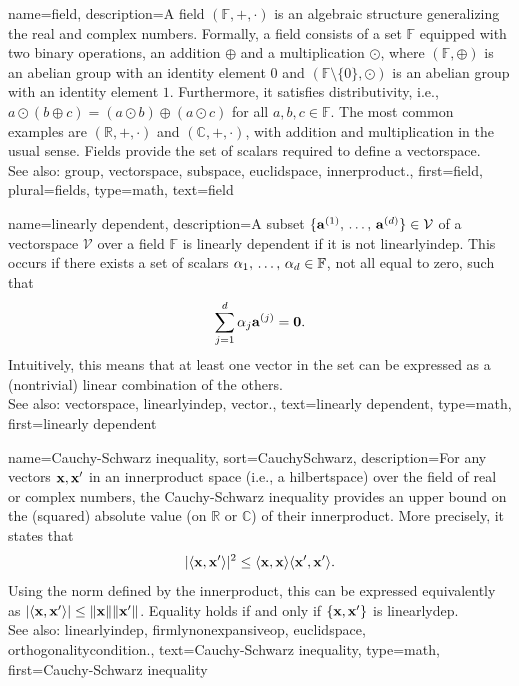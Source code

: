 {name={field},
	description={A field $(\mathbb{F}, +, \cdot)$ is an algebraic structure generalizing the real and complex numbers. 
		Formally, a field consists of a set $\mathbb{F}$ equipped with two binary operations, an addition $\oplus$ 
		and a multiplication $\odot$, where $(\mathbb{F}, \oplus)$ is an abelian \gls{group} with an identity element $0$ 
		and $(\mathbb{F} \setminus \{0\}, \odot)$ is an abelian \gls{group} with an identity element $1$. 
		Furthermore, it satisfies distributivity, i.e.,  $a \odot (b \oplus c) = (a \odot b) \oplus (a \odot c)$ for all $a, b, c \in \mathbb{F}$. 
		The most common examples are $(\mathbb{R}, +, \cdot)$ and $(\mathbb{C}, +, \cdot)$, with addition and multiplication 
		in the usual sense. Fields provide the set of scalars required to define a \gls{vectorspace}. 
		\\
		See also: \gls{group}, \gls{vectorspace}, \gls{subspace}, \gls{euclidspace}, \gls{innerproduct}.},
	first={field},
	plural={fields},
	type=math,
	text={field}
}

{name={linearly dependent},
	description={A subset $\{{\bf a}^{(1)}, \,\ldots, \,{\bf a}^{(d)}\} \in \mathcal{V}$ 
		of a \gls{vectorspace} $\mathcal{V}$ over a \gls{field} $\mathbb{F}$ is linearly 
		dependent if it is not \gls{linearlyindep}. 
		This occurs if there exists a set of scalars $\alpha_1, \,\ldots, \,\alpha_{d} \in \mathbb{F}$, 
		not all equal to zero, such that 
		$$\sum_{j=1}^{d} \alpha_{j} {\bf a}^{(j)} = \mathbf{0}.$$ 
		Intuitively, this means that at least one \gls{vector} in the set can be expressed as a 
		(nontrivial) linear combination of the others. 
		\\ 
		See also: \gls{vectorspace}, \gls{linearlyindep}, \gls{vector}.},
	text={linearly dependent},
	type=math,
	first={linearly dependent}
}

{name={Cauchy-Schwarz inequality},
sort={CauchySchwarz},
	description={For any \glspl{vector} ${\bf x}, {\bf x}'$ in an \gls{innerproduct} space (i.e., a \gls{hilbertspace}) 
		over the \gls{field} of real or complex numbers, the Cauchy-Schwarz inequality 
		provides an upper bound on the (squared) absolute value 
		(on $\mathbb{R}$ or $\mathbb{C}$) of their \gls{innerproduct}. More precisely, it states that
		\[
			|\langle {\bf x}, {\bf x}' \rangle|^2 \leq \langle {\bf x}, {\bf x} \rangle \langle {\bf x}', {\bf x}' \rangle.
		\]
		  Using the \gls{norm} defined by the \gls{innerproduct}, this can be expressed equivalently as
		$|\langle {\bf x}, {\bf x}' \rangle| \leq \Vert {{\bf x}} \Vert \Vert {{\bf x}'} \Vert$.
		Equality holds if and only if $\{{\bf x}, {\bf x}'\}$ is \gls{linearlydep}. 
		\\
		See also: \gls{linearlyindep}, \gls{firmlynonexpansiveop}, \gls{euclidspace}, \gls{orthogonalitycondition}.},
	text={Cauchy-Schwarz inequality},
	type=math,
	first={Cauchy-Schwarz inequality}
}

